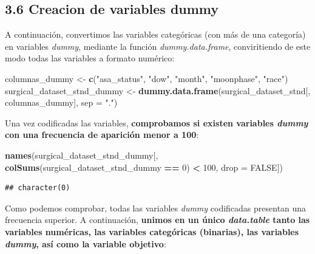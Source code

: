 \documentclass[
]{article}
\newenvironment{Shaded}{\begin{snugshade}}{\end{snugshade}}
\newcommand{\DataTypeTok}[1]{\textcolor[rgb]{0.13,0.29,0.53}{#1}}
\newcommand{\DecValTok}[1]{\textcolor[rgb]{0.00,0.00,0.81}{#1}}
\newcommand{\KeywordTok}[1]{\textcolor[rgb]{0.13,0.29,0.53}{\textbf{#1}}}
\newcommand{\NormalTok}[1]{#1}
\newcommand{\OperatorTok}[1]{\textcolor[rgb]{0.81,0.36,0.00}{\textbf{#1}}}
\newcommand{\OtherTok}[1]{\textcolor[rgb]{0.56,0.35,0.01}{#1}}
\newcommand{\StringTok}[1]{\textcolor[rgb]{0.31,0.60,0.02}{#1}}
\begin{document}
\hypertarget{creacion-de-variables-dummy}{%
\subsection{3.6 Creacion de variables
dummy}\label{creacion-de-variables-dummy}}

A continuación, convertimos las variables categóricas (con más de una
categoría) en variables \emph{dummy}, mediante la función
\emph{dummy.data.frame}, conviritiendo de este modo todas las variables
a formato numérico:

\begin{Shaded}
\begin{Highlighting}[]
\NormalTok{columnas\_dummy <{-}}\StringTok{ }\KeywordTok{c}\NormalTok{(}\StringTok{"asa\_status"}\NormalTok{, }\StringTok{"dow"}\NormalTok{, }\StringTok{"month"}\NormalTok{, }\StringTok{"moonphase"}\NormalTok{, }\StringTok{"race"}\NormalTok{)}
\NormalTok{surgical\_dataset\_stnd\_dummy <{-}}\StringTok{ }\KeywordTok{dummy.data.frame}\NormalTok{(surgical\_dataset\_stnd[, columnas\_dummy], }
                                                            \DataTypeTok{sep =} \StringTok{"."}\NormalTok{)}
\end{Highlighting}
\end{Shaded}

Una vez codificadas las variables, \textbf{comprobamos si existen
variables \emph{dummy} con una frecuencia de aparición menor a 100}:

\begin{Shaded}
\begin{Highlighting}[]
\KeywordTok{names}\NormalTok{(surgical\_dataset\_stnd\_dummy[, }\KeywordTok{colSums}\NormalTok{(surgical\_dataset\_stnd\_dummy }\OperatorTok{==}\StringTok{ }\DecValTok{0}\NormalTok{) }\OperatorTok{<}\StringTok{ }\DecValTok{100}\NormalTok{, }
                                  \DataTypeTok{drop =} \OtherTok{FALSE}\NormalTok{])}
\end{Highlighting}
\end{Shaded}

\begin{verbatim}
## character(0)
\end{verbatim}

Como podemos comprobar, todas las variables \emph{dummy} codificadas
presentan una frecuencia superior. A continuación, \textbf{unimos en un
único \emph{data.table} tanto las variables numéricas, las variables
categóricas (binarias), las variables \emph{dummy}, así como la variable
objetivo}:
\end{document}
